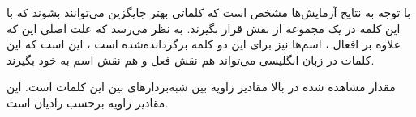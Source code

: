 \begin{boxA}

  با توجه به نتایج آزمایش‌ها مشخص است که کلماتی
  بهتر جایگزین می‌توانند بشوند که با این کلمه در یک مجموعه از نقش قرار بگیرند.
  به نظر می‌رسد که علت اصلی این که علاوه بر افعال ، اسم‌ها نیز برای این دو کلمه برگردانده‌شده است ، این است که این کلمات در زبان انگلیسی می‌تواند هم نقش فعل و هم نقش اسم به خود بگیرند.

  مقدار مشاهده شده در بالا مقادیر زاویه بین شبه‌بردارهای بین این کلمات است.
  این مقادیر زاویه برحسب رادیان است.
\end{boxA}